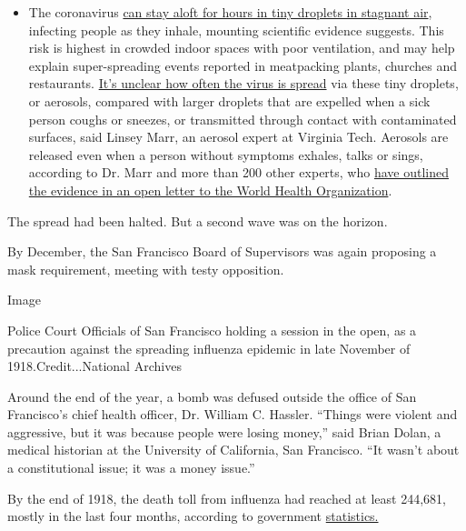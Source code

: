 \begin{itemize}
  \begin{itemize}
  \tightlist
  \item
    The coronavirus
    \href{https://www.nytimes.com/2020/07/04/health/239-experts-with-one-big-claim-the-coronavirus-is-airborne.html?action=click\&pgtype=Article\&state=default\&region=MAIN_CONTENT_3\&context=storylines_faq}{can
    stay aloft for hours in tiny droplets in stagnant air}, infecting
    people as they inhale, mounting scientific evidence suggests. This
    risk is highest in crowded indoor spaces with poor ventilation, and
    may help explain super-spreading events reported in meatpacking
    plants, churches and restaurants.
    \href{https://www.nytimes.com/2020/07/06/health/coronavirus-airborne-aerosols.html?action=click\&pgtype=Article\&state=default\&region=MAIN_CONTENT_3\&context=storylines_faq}{It's
    unclear how often the virus is spread} via these tiny droplets, or
    aerosols, compared with larger droplets that are expelled when a
    sick person coughs or sneezes, or transmitted through contact with
    contaminated surfaces, said Linsey Marr, an aerosol expert at
    Virginia Tech. Aerosols are released even when a person without
    symptoms exhales, talks or sings, according to Dr. Marr and more
    than 200 other experts, who
    \href{https://academic.oup.com/cid/article/doi/10.1093/cid/ciaa939/5867798}{have
    outlined the evidence in an open letter to the World Health
    Organization}.
  \end{itemize}
\end{itemize}

The spread had been halted. But a second wave was on the horizon.

By December, the San Francisco Board of Supervisors was again proposing
a mask requirement, meeting with testy opposition.

Image

Police Court Officials of San Francisco holding a session in the open,
as a precaution against the spreading influenza epidemic in late
November of 1918.Credit...National Archives

Around the end of the year, a bomb was defused outside the office of San
Francisco's chief health officer, Dr. William C. Hassler. ``Things were
violent and aggressive, but it was because people were losing money,''
said Brian Dolan, a medical historian at the University of California,
San Francisco. ``It wasn't about a constitutional issue; it was a money
issue.''

By the end of 1918, the death toll from influenza had reached at least
244,681, mostly in the last four months, according to government
\href{https://www.cdc.gov/nchs/data/vsushistorical/mortstatsh_1918.pdf}{statistics.}

